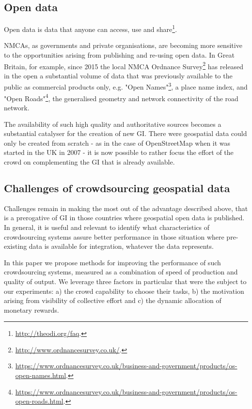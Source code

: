 \documentclass{llncs}
\begin{document}
\subsection{Open data}

Open data is data that anyone can access, use and share\footnote{\url{http://theodi.org/faq}.}. 

NMCAs, as governments and private organisations, are becoming more sensitive to the opportunities arising from publishing and re-using open data. In Great Britain, for example, since 2015 the local NMCA Ordnance Survey\footnote{\url{http://www.ordnancesurvey.co.uk/}.} has released in the open a substantial volume of data that was previously available to the public as commercial products only, e.g. "Open Names"\footnote{\url{https://www.ordnancesurvey.co.uk/business-and-government/products/os-open-names.html}.}, a place name index, and "Open Roads"\footnote{\url{https://www.ordnancesurvey.co.uk/business-and-government/products/os-open-roads.html}.}, the generalised geometry and network connectivity of the road network.

The availability of such high quality and authoritative sources becomes a substantial catalyser for the creation of new GI. There were geospatial data could only be created from scratch - as in the case of OpenStreetMap when it was started in the UK in 2007 - it is now possible to rather focus the effort of the crowd on complementing the GI that is already available.

\subsection{Challenges of crowdsourcing geospatial data}

Challenges remain in making the most out of the advantage described above, that is a prerogative of GI in those countries where geospatial open data is published. In general, it is useful and relevant to identify what characteristics of crowdsourcing systems assure better performance in those situation where pre-existing data is available for integration, whatever the data represents. 

In this paper we propose methods for improving the performance of such crowdsourcing systems, measured as a combination of speed of production and quality of output. We leverage three factors in particular that were the subject to our experiments: a) the crowd capability to choose their tasks, b) the motivation arising from visibility of collective effort and c) the dynamic allocation of monetary rewards.
\end{document}
